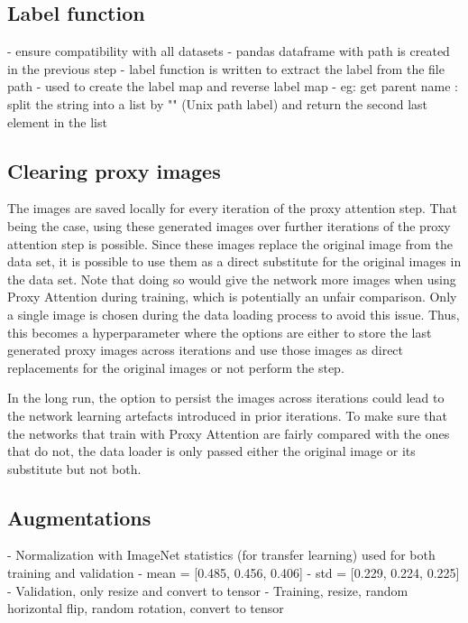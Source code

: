\subsection{Label function}
- ensure compatibility with all datasets
- pandas dataframe with path is created in the previous step
- label function is written to extract the label from the file path
- used to create the label map and reverse label map 
- eg: get parent name : split the string into a list by "\/" (Unix path label) and return the second last element in the list


\subsection{Clearing proxy images} \label{sec:clearing_proxy_images}
The images are saved locally for every iteration of the proxy attention step. That being the case, using these generated images over further iterations of the proxy attention step is possible. Since these images replace the original image from the data set, it is possible to use them as a direct substitute for the original images in the data set. Note that doing so would give the network more images when using Proxy Attention during training, which is potentially an unfair comparison. Only a single image is chosen during the data loading process to avoid this issue. Thus, this becomes a hyperparameter where the options are either to store the last generated proxy images across iterations and use those images as direct replacements for the original images or not perform the step. 

In the long run, the option to persist the images across iterations could lead to the network learning artefacts introduced in prior iterations. To make sure that the networks that train with Proxy Attention are fairly compared with the ones that do not, the data loader is only passed either the original image or its substitute but not both. 

\subsection{Augmentations}
- Normalization with ImageNet statistics (for transfer learning) used for both training and validation 
    - mean = [0.485, 0.456, 0.406]
    - std = [0.229, 0.224, 0.225]
- Validation, only resize and convert to tensor
- Training, resize, random horizontal flip, random rotation, convert to tensor

